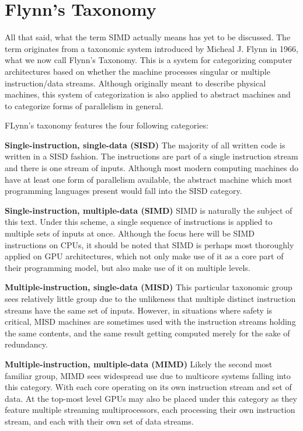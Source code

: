 \section{Flynn's Taxonomy}
All that said, what the term SIMD actually means has yet to be discussed. The
term originates from a taxonomic system introduced by Micheal J. Flynn in 1966,
what we now call Flynn's Taxonomy. This is a system for categorizing computer
architectures based on whether the machine processes singular or multiple
instruction/data streams. Although originally meant to describe physical
machines, this system of categorization is also applied to abstract machines and
to categorize forms of parallelism in general.

FLynn's taxonomy features the four following categories:

\textbf{Single-instruction, single-data (SISD)} The majority of all written code
is written in a SISD fashion. The instructions are part of a single instruction
stream and there is one stream of inputs. Although most modern computing
machines do have at least one form of parallelism available, the abstract
machine which most programming languages present would fall into the SISD
category.

\textbf{Single-instruction, multiple-data (SIMD)} SIMD is naturally the subject
of this text. Under this scheme, a single sequence of instructions is applied to
multiple sets of inputs at once. Although the focus here will be SIMD
instructions on CPUs, it should be noted that SIMD is perhaps most thoroughly
applied on GPU architectures, which not only make use of it as a core part of
their programming model, but also make use of it on multiple levels.

\textbf{Multiple-instruction, single-data (MISD)} This particular taxonomic
group sees relatively little group due to the unlikeness that multiple distinct
instruction streams have the same set of inputs. However, in situations where
safety is critical, MISD machines are sometimes used with the instruction
streams holding the same contents, and the same result getting computed merely
for the sake of redundancy.

\textbf{Multiple-instruction, multiple-data (MIMD)} Likely the second most
familiar group, MIMD sees widespread use due to multicore systems falling into
this category. With each core operating on its own instruction stream and set of
data. At the top-most level GPUs may also be placed under this category as they
feature multiple streaming multiprocessors, each processing their own
instruction stream, and each with their own set of data streams.

